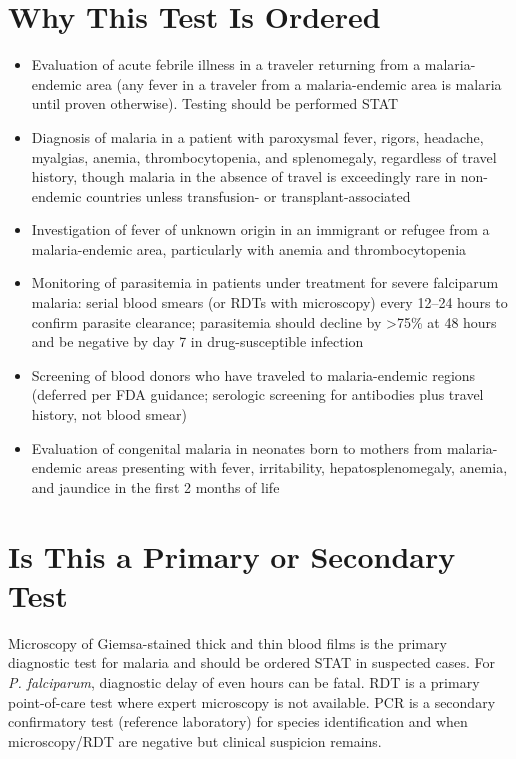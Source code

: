 \section*{Why This Test Is Ordered}
\begin{itemize}
  \item Evaluation of acute febrile illness in a traveler returning from a malaria-endemic area (any fever in a traveler from a malaria-endemic area is malaria until proven otherwise). Testing should be performed STAT
  \item Diagnosis of malaria in a patient with paroxysmal fever, rigors, headache, myalgias, anemia, thrombocytopenia, and splenomegaly, regardless of travel history, though malaria in the absence of travel is exceedingly rare in non-endemic countries unless transfusion- or transplant-associated
  \item Investigation of fever of unknown origin in an immigrant or refugee from a malaria-endemic area, particularly with anemia and thrombocytopenia
  \item Monitoring of parasitemia in patients under treatment for severe falciparum malaria: serial blood smears (or RDTs with microscopy) every 12--24 hours to confirm parasite clearance; parasitemia should decline by >75\% at 48 hours and be negative by day 7 in drug-susceptible infection
  \item Screening of blood donors who have traveled to malaria-endemic regions (deferred per FDA guidance; serologic screening for antibodies plus travel history, not blood smear)
  \item Evaluation of congenital malaria in neonates born to mothers from malaria-endemic areas presenting with fever, irritability, hepatosplenomegaly, anemia, and jaundice in the first 2 months of life
\end{itemize}

\section*{Is This a Primary or Secondary Test}
Microscopy of Giemsa-stained thick and thin blood films is the primary diagnostic test for malaria and should be ordered STAT in suspected cases. For \textit{P. falciparum}, diagnostic delay of even hours can be fatal. RDT is a primary point-of-care test where expert microscopy is not available. PCR is a secondary confirmatory test (reference laboratory) for species identification and when microscopy/RDT are negative but clinical suspicion remains.

